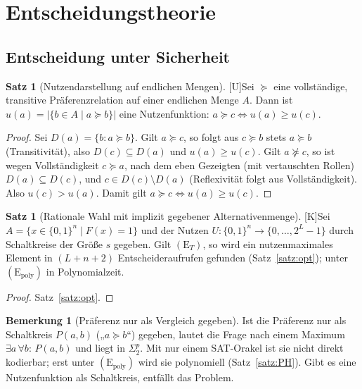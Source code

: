 \documentclass[a4paper,12pt]{article}
\theoremstyle{definition}
\newtheorem{satz}[definition]{Satz}
\newtheorem{bemerkung}[definition]{Bemerkung}
\newcommand{\tU}{\textsf{\small[U]}}   %
\newcommand{\tK}{\textsf{\small[K]}}   %
\newcommand{\bits}{\{0,1\}}
\newcommand{\Epoly}{(\mathrm{E}_{\mathrm{poly}})}
\newcommand{\ET}{(\mathrm{E}_{T})}
\begin{document}
\section{Entscheidungstheorie}
\label{eco:decision}

\subsection{Entscheidung unter Sicherheit}
\begin{satz}[Nutzendarstellung auf endlichen Mengen]\tU\label{satz:utility}
Sei \(\succeq\) eine vollständige, transitive Präferenzrelation auf einer endlichen Menge \(A\). Dann ist \(u(a)=|\{b\in A\mid a\succeq b\}|\) eine Nutzenfunktion: \(a\succeq c\iff u(a)\ge u(c)\).
\end{satz}
\begin{proof}
Sei \(D(a)=\{b: a\succeq b\}\). Gilt \(a\succeq c\), so folgt aus \(c\succeq b\) stets \(a\succeq b\) (Transitivität), also \(D(c)\subseteq D(a)\) und \(u(a)\ge u(c)\). Gilt \(a\not\succeq c\), so ist wegen Vollständigkeit \(c\succeq a\), nach dem eben Gezeigten (mit vertauschten Rollen) \(D(a)\subseteq D(c)\), und \(c\in D(c)\setminus D(a)\) (Reflexivität folgt aus Vollständigkeit). Also \(u(c)>u(a)\). Damit gilt \(a\succeq c\iff u(a)\ge u(c)\).
\end{proof}

\begin{satz}[Rationale Wahl mit implizit gegebener Alternativenmenge]\tK\label{satz:choice}
Sei \(A=\{x\in\bits^n\mid F(x)=1\}\) und der Nutzen \(U:\bits^n\to\{0,\dots,2^L-1\}\) durch Schaltkreise der Größe \(s\) gegeben. Gilt \(\ET\), so wird ein nutzenmaximales Element in \((L+n+2)\) Entscheideraufrufen gefunden (Satz~\ref{satz:opt}); unter \(\Epoly\) in Polynomialzeit.
\end{satz}
\begin{proof}
Satz~\ref{satz:opt}.
\end{proof}

\begin{bemerkung}[Präferenz nur als Vergleich gegeben]\label{bem:cmp}
Ist die Präferenz nur als Schaltkreis \(P(a,b)\) („\(a\succeq b\)“) gegeben, lautet die Frage nach einem Maximum \(\exists a\,\forall b:\,P(a,b)\) und liegt in \(\Sigma_2^{p}\). Mit nur einem SAT-Orakel ist sie nicht direkt kodierbar; erst unter \(\Epoly\) wird sie polynomiell (Satz~\ref{satz:PH}). Gibt es eine Nutzenfunktion als Schaltkreis, entfällt das Problem.
\end{bemerkung}
\end{document}
